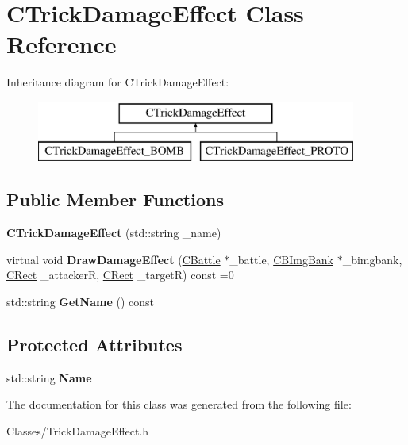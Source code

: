 \hypertarget{class_c_trick_damage_effect}{}\section{C\+Trick\+Damage\+Effect Class Reference}
\label{class_c_trick_damage_effect}
Inheritance diagram for C\+Trick\+Damage\+Effect\+:\begin{figure}[H]
\begin{center}
\leavevmode
\includegraphics[height=2.000000cm]{class_c_trick_damage_effect}
\end{center}
\end{figure}
\subsection*{Public Member Functions}
\begin{DoxyCompactItemize}
\item 
{\bfseries C\+Trick\+Damage\+Effect} (std\+::string \+\_\+name)\hypertarget{class_c_trick_damage_effect_acec98051ffc3a877bd951361979e6512}{}\label{class_c_trick_damage_effect_acec98051ffc3a877bd951361979e6512}

\item 
virtual void {\bfseries Draw\+Damage\+Effect} (\hyperlink{class_c_battle}{C\+Battle} $\ast$\+\_\+battle, \hyperlink{class_c_b_img_bank}{C\+B\+Img\+Bank} $\ast$\+\_\+bimgbank, \hyperlink{class_c_rect}{C\+Rect} \+\_\+attackerR, \hyperlink{class_c_rect}{C\+Rect} \+\_\+targetR) const  =0\hypertarget{class_c_trick_damage_effect_ad13370446279773d91d842472dd9f8f9}{}\label{class_c_trick_damage_effect_ad13370446279773d91d842472dd9f8f9}

\item 
std\+::string {\bfseries Get\+Name} () const \hypertarget{class_c_trick_damage_effect_aabeea6bf435c8fc11645c1bb3761be1f}{}\label{class_c_trick_damage_effect_aabeea6bf435c8fc11645c1bb3761be1f}

\end{DoxyCompactItemize}
\subsection*{Protected Attributes}
\begin{DoxyCompactItemize}
\item 
std\+::string {\bfseries Name}\hypertarget{class_c_trick_damage_effect_a5e03077b434b9b00aeff2b0c64a4d065}{}\label{class_c_trick_damage_effect_a5e03077b434b9b00aeff2b0c64a4d065}

\end{DoxyCompactItemize}


The documentation for this class was generated from the following file\+:\begin{DoxyCompactItemize}
\item 
Classes/Trick\+Damage\+Effect.\+h\end{DoxyCompactItemize}
